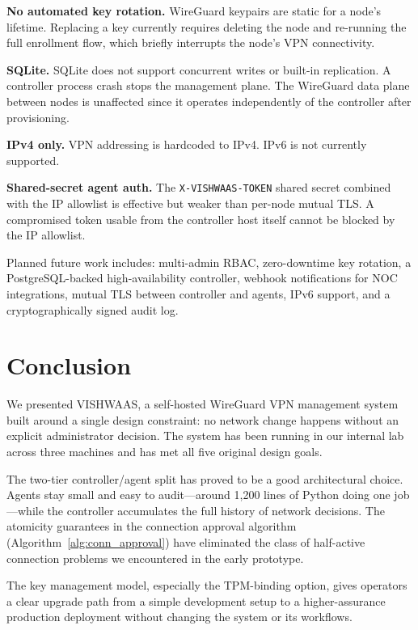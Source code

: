 \documentclass[conference]{IEEEtran}
\begin{document}
\textbf{No automated key rotation.} WireGuard keypairs are static for a
node's lifetime. Replacing a key currently requires deleting the node and
re-running the full enrollment flow, which briefly interrupts the node's VPN
connectivity.

\textbf{SQLite.} SQLite does not support concurrent writes or built-in
replication. A controller process crash stops the management plane. The
WireGuard data plane between nodes is unaffected since it operates
independently of the controller after provisioning.

\textbf{IPv4 only.} VPN addressing is hardcoded to IPv4. IPv6 is not
currently supported.

\textbf{Shared-secret agent auth.} The \texttt{X-VISHWAAS-TOKEN} shared
secret combined with the IP allowlist is effective but weaker than per-node
mutual TLS. A compromised token usable from the controller host itself
cannot be blocked by the IP allowlist.

Planned future work includes: multi-admin RBAC, zero-downtime key rotation,
a PostgreSQL-backed high-availability controller, webhook notifications for
NOC integrations, mutual TLS between controller and agents, IPv6 support,
and a cryptographically signed audit log.


\section{Conclusion}
\label{sec:conclusion}

We presented VISHWAAS, a self-hosted WireGuard VPN management system built
around a single design constraint: no network change happens without an
explicit administrator decision. The system has been running in our internal
lab across three machines and has met all five original design goals.

The two-tier controller/agent split has proved to be a good architectural
choice. Agents stay small and easy to audit---around 1,200 lines of Python
doing one job---while the controller accumulates the full history of network
decisions. The atomicity guarantees in the connection approval algorithm
(Algorithm~\ref{alg:conn_approval}) have eliminated the class of half-active
connection problems we encountered in the early prototype.

The key management model, especially the TPM-binding option, gives operators
a clear upgrade path from a simple development setup to a higher-assurance
production deployment without changing the system or its workflows.
\end{document}

